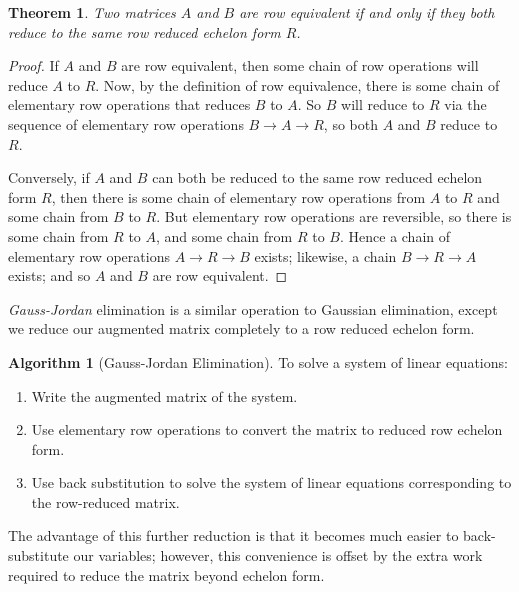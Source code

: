 \documentclass[10pt, a4paper]{amsart}
\newtheorem{thm}{Theorem}
\theoremstyle{definition}
\newtheorem{alg}{Algorithm}
\theoremstyle{remark}
\begin{document}
\begin{thm}
  Two matrices $ A $ and $ B $ are row equivalent if and only if they both
  reduce to the same row reduced echelon form $ R $.
\end{thm}
\begin{proof}
  If $ A $ and $ B $ are row equivalent, then some chain of row operations will
  reduce $ A $ to $ R $. Now, by the definition of row equivalence, there is
  some chain of elementary row operations that reduces $ B $ to $ A $. So $ B $
  will reduce to $ R $ via the sequence of elementary row operations $ B \rightarrow A \rightarrow R $,
  so both $ A $ and $ B $ reduce to $ R $.

  Conversely, if $ A $ and $ B $ can both be reduced to the same row reduced echelon form $ R $,
  then there is some chain of elementary row operations from $ A $ to $ R $ and some
  chain from $ B $ to $ R $. But elementary row operations are reversible, so there is
  some chain from $ R $ to $ A $, and some chain from $ R $ to $ B $. Hence a chain
  of elementary row operations $ A \rightarrow R \rightarrow B $ exists; likewise,
  a chain $ B \rightarrow R \rightarrow A $ exists; and so $ A $ and $ B $ are row
  equivalent.
\end{proof}

\textit{Gauss-Jordan} elimination is a similar operation to Gaussian elimination, except
we reduce our augmented matrix completely to a row reduced echelon form.
\begin{alg}[Gauss-Jordan Elimination]
  To solve a system of linear equations:
  \begin{enumerate}
    \item Write the augmented matrix of the system.
    \item Use elementary row operations to convert the matrix to reduced row echelon form.
    \item Use back substitution to solve the system of linear equations corresponding
          to the row-reduced matrix.
  \end{enumerate}
\end{alg}

The advantage of this further reduction is that it becomes much easier to back-substitute
our variables; however, this convenience is offset by the extra work required to reduce
the matrix beyond echelon form.
\end{document}
